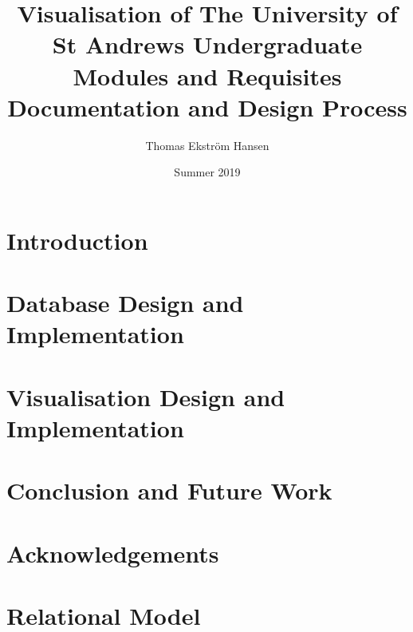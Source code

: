 \documentclass[12pt]{report}
\title{Visualisation of The University of St Andrews Undergraduate Modules and
Requisites\\
\large \vspace*{0.5em} Documentation and Design Process}
\author{Thomas Ekstr{\" o}m Hansen}
\date{Summer 2019}
\begin{document}
    \maketitle
    
    \tableofcontents
    
    \chapter{Introduction}
    
    
    \chapter{Database Design and Implementation}
    
    
    \chapter{Visualisation Design and Implementation}
    
    
    \chapter{Conclusion and Future Work}
    
    
    \chapter{Acknowledgements}
    
    
    \appendix
    
    \chapter{Relational Model}\label{app:rel-model}
    
\end{document}
